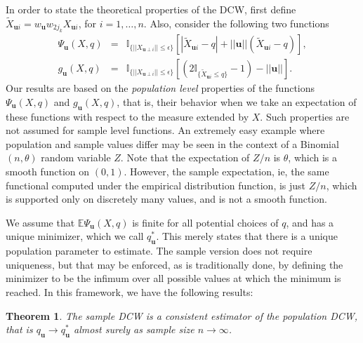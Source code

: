 \documentclass[twoside]{article}
\newtheorem{Theorem}{Theorem}[section]
\begin{document}
In order to state the theoretical properties of the DCW, first
define $\tilde X_{\mathbf{u} i} = 
w_{\mathbf{u}} w_{2 j_{k}} X_{\mathbf{u} i}$, for $i =1, \ldots, n$.  
Also, consider the following two functions
\begin{eqnarray*}
\Psi_{\mathbf{u}} (X, q) &  = & 
\mathbb{I}_{ \{ || X_{\mathbf{u} \perp i} || \leq \epsilon \}} 
\left[ | \tilde X_{\mathbf{u} i}  - q | + ||\mathbf{u}|| (\tilde X_{\mathbf{u} i}  - q ) 
\right], \\
g_{\mathbf{u}} (X, q)  & = &
\mathbb{I}_{ \{ || X_{\mathbf{u} \perp i} || \leq \epsilon \}} 
\left[ \left( 2 \mathbb{I}_{ \{ \tilde{X}_{\mathbf{u} i} \leq q \}} - 1 \right)
- ||\mathbf{u}|| \right].
\end{eqnarray*}
Our results are based on the {\it population level} properties of 
the functions $\Psi_{\mathbf{u}} (X, q) $ and $g_{\mathbf{u}} (X, q)$, that is, 
their behavior when we take an expectation of these functions with respect to 
the measure extended by $X$. Such properties are not assumed for sample level 
functions. 
 An extremely easy 
example where population and sample values differ 
may be seen in the context of a Binomial $(n, \theta)$ random variable $Z$. Note that 
the expectation of $Z/n$ is $\theta$, which is a smooth function on $(0, 1)$. However, 
the sample expectation, ie, the same functional computed under the empirical distribution 
function, is just $Z/n$, which is supported only on discretely many values, and is not 
a smooth function. 



We assume that $\mathbb{E} \Psi_{\mathbf{u}} (X, q) $ is finite for all potential choices 
of $q$, and has a unique minimizer, which we call $q_{\mathbf{u}}^{*}$.
This merely states  that there is a unique population parameter to estimate. 
The sample version does not require uniqueness, but 
that may be enforced, as is traditionally done,  by defining the minimizer to be the infimum over all possible values at which the minimum is reached.
In this framework, we have the following results:

 
\begin{Theorem} \label{thm:Consistency}
The sample DCW is a consistent estimator of the population DCW, that is 
 $q_{\mathbf{u}} \rightarrow q_{\mathbf{u}}^{*}$ almost surely as 
sample size $n \rightarrow \infty$.
\end{Theorem}
\end{document}
